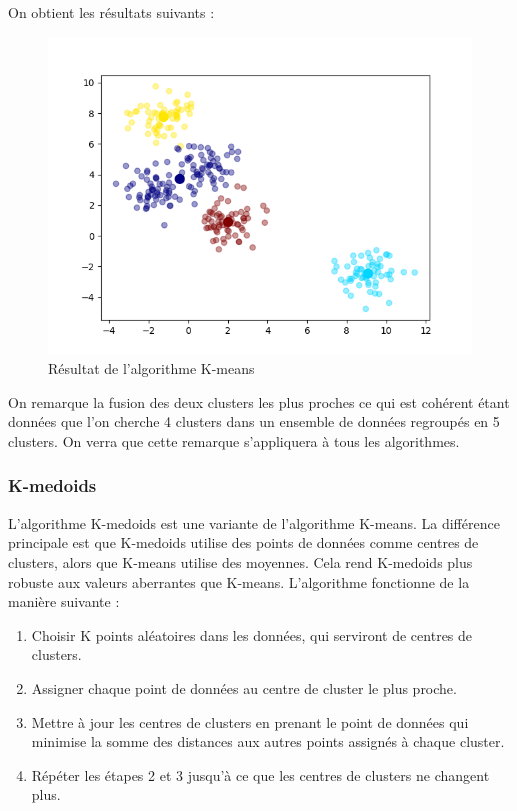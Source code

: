 \documentclass[french,a4paper,18pt]{article}
\begin{document}
On obtient les résultats suivants :
\begin{figure}[h]
    \centering
    \includegraphics[scale=0.5]{images/short_simulation_kmeans.png}
    \caption{Résultat de l'algorithme K-means}\label{fig:short_simulation_kmeans}
\end{figure}

On remarque la fusion des deux clusters les plus proches ce qui est cohérent 
étant données que l'on cherche 4 clusters dans un ensemble de données regroupés en 5 clusters.
On verra que cette remarque s'appliquera à tous les algorithmes.


\subsubsection{K-medoids}

L'algorithme K-medoids est une variante de l'algorithme K-means. 
La différence principale est que K-medoids utilise des points de données comme centres de clusters, alors que K-means utilise des moyennes.
Cela rend K-medoids plus robuste aux valeurs aberrantes que K-means.
L'algorithme fonctionne de la manière suivante :
\begin{enumerate}
    \item Choisir K points aléatoires dans les données, qui serviront de centres de clusters.
    \item Assigner chaque point de données au centre de cluster le plus proche.
    \item Mettre à jour les centres de clusters en prenant le point de données qui minimise la somme des distances aux autres points assignés à chaque cluster.
    \item Répéter les étapes 2 et 3 jusqu'à ce que les centres de clusters ne changent plus.
\end{enumerate}
\end{document}
